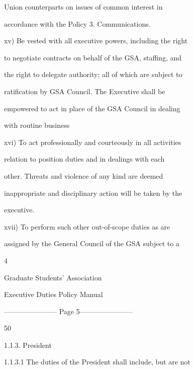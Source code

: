          Union  counterparts  on  issues  of  common  interest  in  

         accordance with the Policy 3. Communications.   

  

xv)      Be vested with all executive powers, including the right  

         to negotiate contracts on behalf of the GSA, staffing, and  

         the right to delegate authority; all of which are subject to  

         ratification  by  GSA  Council.  The  Executive  shall  be  

         empowered to act in place of the GSA Council in dealing  

         with routine business   

  

xvi)     To  act  professionally  and  courteously  in  all  activities  

         relation  to  position  duties  and  in  dealings  with  each  

         other.  Threats  and  violence  of  any  kind  are  deemed  

         inappropriate and disciplinary action will be taken by the  

         executive.   

  

xvii)   To      perform       such     other     out-of-scope         duties     as    are  

         assigned by the General Council of the GSA subject to a  



                                        4  

                            

                          Graduate Students’ Association  

                          Executive Duties Policy Manual  

  


----------------------- Page 5-----------------------

                  50%

  

1.1.3. President  

  

1.1.3.1           The  duties  of  the  President  shall  include,  but  are  not  

